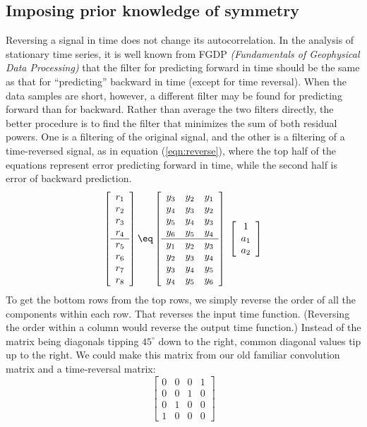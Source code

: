\subsection{Imposing prior knowledge of symmetry}
\label{prior knowledge of symmetry}
Reversing a signal in time
does not change its autocorrelation.
In the analysis of stationary time series,
it is well known from FGDP {\em (Fundamentals of Geophysical Data Processing)}  that the filter
for predicting forward in time
should be the same as that for ``predicting'' backward in time
(except for time reversal).
When the data samples are short, however,
a different filter may be found for predicting forward than for backward.
Rather than average the two filters directly,
the better procedure
is to find the filter that minimizes the sum of both residual powers.
One is a filtering of the original signal,
and the other is a filtering of a time-reversed signal,
as in equation (\ref{eqn:reverse}),
where the top half of the equations represent error
predicting forward in time,
while the second half is error of backward prediction.
\begin{equation}
\left[
\begin{array}{c}
  r_1 \\
  r_2 \\
  r_3 \\
  r_4 \\   \hline
  r_5 \\
  r_6 \\
  r_7 \\
  r_8
  \end{array} \right]
\eq
\left[
\begin{array}{ccc}
  y_3 & y_2 & y_1  \\
  y_4 & y_3 & y_2  \\
  y_5 & y_4 & y_3  \\
  y_6 & y_5 & y_4  \\   \hline
  y_1 & y_2 & y_3  \\
  y_2 & y_3 & y_4  \\
  y_3 & y_4 & y_5  \\
  y_4 & y_5 & y_6 
  \end{array} \right]
\; \left[
\begin{array}{c}
  1   \\
  a_1 \\
  a_2 \end{array} \right]
\label{eqn:reverse}
\end{equation}
To get the bottom rows from the top rows,
we simply reverse the order of all the components within each row.
That reverses the input time function.
(Reversing the order within a column would reverse the output time function.)
Instead of the matrix being diagonals tipping $45^\circ$ down to the right,
common diagonal values tip up to the right.
We could make this matrix from our old
familiar convolution matrix
and a time-reversal matrix:
$$
\left[
\begin{array}{cccc}
 0 & 0 & 0 & 1  \\
 0 & 0 & 1 & 0  \\
 0 & 1 & 0 & 0  \\
 1 & 0 & 0 & 0 
\end{array}
\right]
$$

